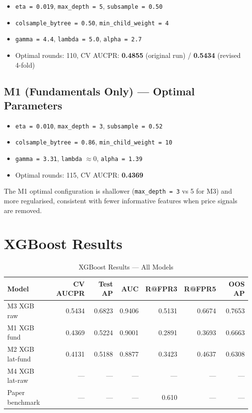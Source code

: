 \documentclass{report}\usepackage[]{graphicx}\usepackage[table]{xcolor}
\begin{document}
\begin{itemize}
    \item \texttt{eta = 0.019}, \texttt{max\_depth = 5}, \texttt{subsample = 0.50}
    \item \texttt{colsample\_bytree = 0.50}, \texttt{min\_child\_weight = 4}
    \item \texttt{gamma = 4.4}, \texttt{lambda = 5.0}, \texttt{alpha = 2.7}
    \item Optimal rounds: 110, CV AUCPR: \textbf{0.4855} (original run) / \textbf{0.5434} (revised 4-fold)
\end{itemize}

\subsection{M1 (Fundamentals Only) — Optimal Parameters}

\begin{itemize}
    \item \texttt{eta = 0.010}, \texttt{max\_depth = 3}, \texttt{subsample = 0.52}
    \item \texttt{colsample\_bytree = 0.86}, \texttt{min\_child\_weight = 10}
    \item \texttt{gamma = 3.31}, \texttt{lambda} $\approx 0$, \texttt{alpha = 1.39}
    \item Optimal rounds: 115, CV AUCPR: \textbf{0.4369}
\end{itemize}

\noindent The M1 optimal configuration is shallower (\texttt{max\_depth = 3} vs 5 for M3) 
and more regularised, consistent with fewer informative features when price signals are removed.

\section{XGBoost Results}

\begin{table}[H]
\centering
\caption{XGBoost Results — All Models}
\begin{tabular}{lrrrrrr}
\toprule
\textbf{Model} & \textbf{CV AUCPR} & \textbf{Test AP} & \textbf{AUC} & \textbf{R@FPR3} & \textbf{R@FPR5} & \textbf{OOS AP} \\
\midrule
M3 XGB raw      & 0.5434 & 0.6823 & 0.9406 & 0.5131 & 0.6674 & 0.7653 \\
M1 XGB fund     & 0.4369 & 0.5224 & 0.9001 & 0.2891 & 0.3693 & 0.6663 \\
M2 XGB lat-fund & 0.4131 & 0.5188 & 0.8877 & 0.3423 & 0.4637 & 0.6308 \\
M4 XGB lat-raw  & — & — & — & — & — & — \\
\midrule
Paper benchmark & — & — & — & 0.610 & — & — \\
\bottomrule
\end{tabular}
\end{table}
\end{document}
